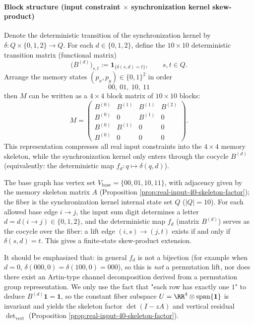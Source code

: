 \paragraph{Block structure (input constraint $\times$ synchronization kernel skew-product)}
Denote the deterministic transition of the synchronization kernel by $\delta:Q\times\{0,1,2\}\to Q$. For each $d\in\{0,1,2\}$, define the $10\times 10$ deterministic transition matrix (functional matrix)
\[
\bigl(B^{(d)}\bigr)_{s,t}:=\mathbf{1}_{\{\delta(s,d)=t\}},
\qquad s,t\in Q.
\]
Arrange the memory states $(p_x,p_y)\in\{0,1\}^2$ in order
\[
00,\ 01,\ 10,\ 11
\]
then $M$ can be written as a $4\times 4$ block matrix of $10\times 10$ blocks:
\[
M=
\begin{pmatrix}
B^{(0)} & B^{(1)} & B^{(1)} & B^{(2)}\\
B^{(0)} & 0   & B^{(1)} & 0\\
B^{(0)} & B^{(1)} & 0   & 0\\
B^{(0)} & 0   & 0   & 0
\end{pmatrix}.
\]
This representation compresses all real input constraints into the $4\times 4$ memory skeleton, while the synchronization kernel only enters through the cocycle $B^{(d)}$ (equivalently: the deterministic map $f_d:q\mapsto\delta(q,d)$).

\begin{remark}\label{rem:real-input-40-deterministic-lift}
The base graph has vertex set \(V_{\mathrm{base}}=\{00,01,10,11\}\), with adjacency given by the memory skeleton matrix \(A\) (Proposition \ref{prop:real-input-40-skeleton-factor}); the fiber is the synchronization kernel internal state set \(Q\) (\(|Q|=10\)).
For each allowed base edge \(i\to j\), the input sum digit determines a letter \(d=d(i\to j)\in\{0,1,2\}\), and the deterministic map \(f_d\) (matrix \(B^{(d)}\)) serves as the cocycle over the fiber:
a lift edge \((i,s)\to(j,t)\) exists if and only if \(\delta(s,d)=t\).
This gives a finite-state skew-product extension.
\par
It should be emphasized that: in general \(f_d\) is not a bijection (for example when $d=0$, \(\delta(000,0)=\delta(100,0)=000\)), so this is \emph{not} a permutation lift, nor does there exist an Artin-type channel decomposition derived from a permutation group representation.
We only use the fact that "each row has exactly one $1$" to deduce \(B^{(d)}\mathbf{1}=\mathbf{1}\), so the constant fiber subspace
\(
U=\RR^{4}\otimes \mathrm{span}\{\mathbf{1}\}
\)
is invariant and yields the skeleton factor \(\det(I-zA)\) and vertical residual \(\det_{\mathrm{vert}}\) (Proposition \ref{prop:real-input-40-skeleton-factor}).
\end{remark}

